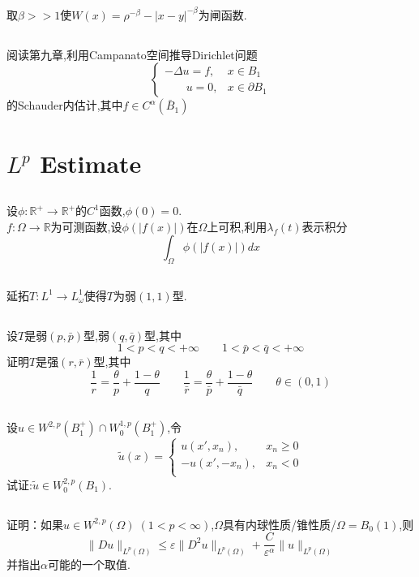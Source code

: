 \documentclass{ctexart}
\numberwithin{equation}{section}
\theoremstyle{plain}
\theoremstyle{plain}
\numberwithin{equation}{section}
\theoremstyle{remark}
\newcommand*{\norm}[1]{\lVert#1\rVert}
\begin{document}
\subsection{}
取$\beta>>1$使$W(x)=\rho^{-\beta}-|x-y|^{-\beta}$为闸函数.
\subsection{}
阅读第九章,利用Campanato空间推导Dirichlet问题
$$\begin{cases}
-\Delta u=f, &x\in B_1\\
\phantom{u=}u=0, & x\in \partial B_1
\end{cases}$$的Schauder内估计,其中$f \in C^{\alpha}(\bar{B}_1)$
\section{$L^p$ Estimate}

\subsection{}
设$\phi:\mathbb{R}^+ \longrightarrow \mathbb{R}^+$的$C^1$函数,$\phi(0)=0$.\\
$f:\Omega \longrightarrow \mathbb{R}$为可测函数,设$\phi(|f(x)|)$在$\Omega$上可积,利用$\lambda_f(t)$表示积分$$\int_{\Omega}\phi(|f(x)|)dx$$
\subsection{}
延拓$T:L^1\longrightarrow L^1_{\omega}$使得$T$为弱$(1,1)$型.
\subsection{}
设$T$是弱$(p,\bar{p})$型,弱$(q,\bar{q})$型,其中
$$1<p<q<+\infty \qquad 1<\bar{p}<\bar{q}<+\infty$$
证明$T$是强$(r,\bar{r})$型,其中
$$\frac{1}{r}=\frac{\theta}{p}+\frac{1-\theta}{q} \qquad \frac{1}{\bar{r}}=\frac{\theta}{\bar{p}}+\frac{1-\theta}{\bar{q}} \qquad \theta \in (0,1)$$
\subsection{}
设$u \in W^{2,p}(B_1^+)\cap W_0^{1,p}(B_1^+)$,令
$$\tilde{u}(x)= \begin{cases}
u(x',x_n), &x_n \geqslant 0\\
-u(x',-x_n), &x_n < 0\\
\end{cases}$$
试证:$\tilde{u} \in W_0^{2,p} (B_1).$
\subsection{}
证明：如果$u \in W^{2,p}(\Omega)\;(1<p<\infty)$,$\Omega$具有内球性质/锥性质/$\Omega=B_0(1)$,则
$$\norm{Du}_{L^p(\Omega)}\leqslant \varepsilon\norm{D^2u}_{L^p(\Omega)} +\frac{C}{\varepsilon^{\alpha}}\norm{u}_{L^p(\Omega)}$$
并指出$\alpha$可能的一个取值.
\end{document}
